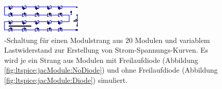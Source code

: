 \begin{figure}[h!tb]
    \centering
    \includegraphics[width=\textwidth]{images/ltspice/jac/stringNoD.eps}
    \caption{%
        -Schaltung  f\"ur  einen   Modulstrang  aus  20  Modulen
        und   variablem  Lastwiderstand      zur  Erstellung   von
        Strom-Spannungs-Kurven. Es  wird   je  ein  Strang  aus   Modulen  mit
        Freilaufdiode   (Abbildung  \ref{fig:ltspice:jacModule:NoDiode})   und
        ohne   Freilaufdiode   (Abbildung   \ref{fig:ltspice:jacModule:Diode})
        simuliert.%
    }
    \label{fig:ltspice:string:ivCurve}
\end{figure}


